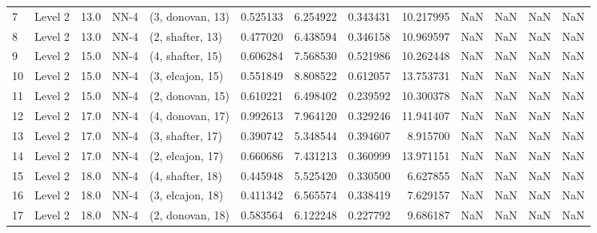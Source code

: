 \begin{tabular}{llrllrrrrrrrr}
7  &   Level 2 &   13.0 &        NN-4 &  (3, donovan, 13) &   0.525133 &   6.254922 &  0.343431 &  10.217995 &                  NaN &                    NaN &                 NaN &                   NaN \\
8  &   Level 2 &   13.0 &        NN-4 &  (2, shafter, 13) &   0.477020 &   6.438594 &  0.346158 &  10.969597 &                  NaN &                    NaN &                 NaN &                   NaN \\
9  &   Level 2 &   15.0 &        NN-4 &  (4, shafter, 15) &   0.606284 &   7.568530 &  0.521986 &  10.262448 &                  NaN &                    NaN &                 NaN &                   NaN \\
10 &   Level 2 &   15.0 &        NN-4 &  (3, elcajon, 15) &   0.551849 &   8.808522 &  0.612057 &  13.753731 &                  NaN &                    NaN &                 NaN &                   NaN \\
11 &   Level 2 &   15.0 &        NN-4 &  (2, donovan, 15) &   0.610221 &   6.498402 &  0.239592 &  10.300378 &                  NaN &                    NaN &                 NaN &                   NaN \\
12 &   Level 2 &   17.0 &        NN-4 &  (4, donovan, 17) &   0.992613 &   7.964120 &  0.329246 &  11.941407 &                  NaN &                    NaN &                 NaN &                   NaN \\
13 &   Level 2 &   17.0 &        NN-4 &  (3, shafter, 17) &   0.390742 &   5.348544 &  0.394607 &   8.915700 &                  NaN &                    NaN &                 NaN &                   NaN \\
14 &   Level 2 &   17.0 &        NN-4 &  (2, elcajon, 17) &   0.660686 &   7.431213 &  0.360999 &  13.971151 &                  NaN &                    NaN &                 NaN &                   NaN \\
15 &   Level 2 &   18.0 &        NN-4 &  (4, shafter, 18) &   0.445948 &   5.525420 &  0.330500 &   6.627855 &                  NaN &                    NaN &                 NaN &                   NaN \\
16 &   Level 2 &   18.0 &        NN-4 &  (3, elcajon, 18) &   0.411342 &   6.565574 &  0.338419 &   7.629157 &                  NaN &                    NaN &                 NaN &                   NaN \\
17 &   Level 2 &   18.0 &        NN-4 &  (2, donovan, 18) &   0.583564 &   6.122248 &  0.227792 &   9.686187 &                  NaN &                    NaN &                 NaN &                   NaN \\

\end{tabular}
